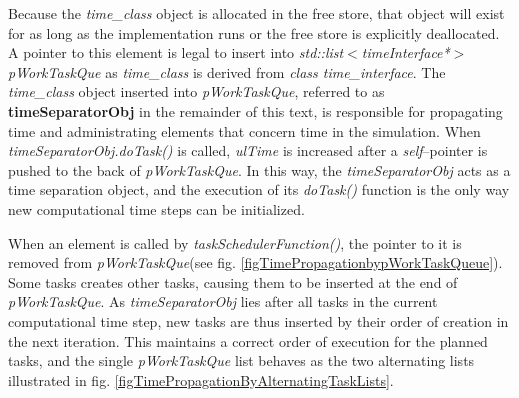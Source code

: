 	Because the \emph{time\_class} object is allocated in the free store, that object will exist for as long as the implementation runs or the free store is explicitly deallocated\cite{Stroustrup2000KAP6}. %
	A pointer to this element is legal to insert into \emph{std::list$<$timeInterface*$>$ pWorkTaskQue} as \emph{time\_class} is derived from \emph{class time\_interface}.
	The \emph{time\_class} object inserted into \emph{pWorkTaskQue}, referred to as {\bf timeSeparatorObj} in the remainder of this text, is responsible for propagating time and administrating elements that concern time in the simulation.
	When \emph{timeSeparatorObj.doTask()} is called, \emph{ulTime} is increased after a \emph{self}--pointer is pushed to the back of \emph{pWorkTaskQue}.
	In this way, the \emph{timeSeparatorObj} acts as a time separation object, and the execution of its \emph{doTask()} function is the only way new computational time steps can be initialized.

	When an element is called by \emph{taskSchedulerFunction()}, the pointer to it is removed from \emph{pWorkTaskQue}(see fig. \ref{figTimePropagationbypWorkTaskQueue}). %
	Some tasks creates other tasks, causing them to be inserted at the end of \emph{pWorkTaskQue}. %
	As \emph{timeSeparatorObj} lies after all tasks in the current computational time step, new tasks are thus inserted by their order of creation in the next iteration. %
	This maintains a correct order of execution for the planned tasks, and the single \emph{pWorkTaskQue} list behaves as the two alternating lists illustrated in fig. \ref{figTimePropagationByAlternatingTaskLists}.


